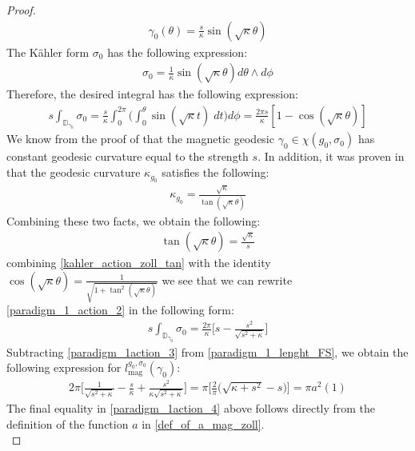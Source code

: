 \documentclass[11pt]{amsart}
\theoremstyle{plain}
\theoremstyle{definition}
\theoremstyle{remark}
\begin{document}
\begin{proof}
\begin{align}\label{mag_geodesic_cpn_eqn}
    \gamma_0(\theta) =\frac{s}{\kappa} \sin(\sqrt{\kappa}\theta) 
\end{align}
The K\"ahler form $\sigma_0$ has the following expression:
\begin{align}\label{kahler_form_pos_curvature}
    \sigma_0 = \frac{1}{\kappa}\sin{(\sqrt{\kappa}\theta)} d\theta \wedge d\phi
\end{align}
Therefore, the desired integral has the following expression:
\begin{align}\label{paradigm_1_action_2}
    s\int_{\mathbb{D}_{\gamma_0}} \sigma_0 =  \frac{s}{\kappa}\int^{2\pi}_0 \Big(\int^{\theta}_0  \sin (\sqrt{\kappa}t) \; dt \Big) d\phi = \frac{2\pi s}{\kappa}[1-\cos (\sqrt{\kappa}\theta)]
\end{align}
We know from the proof of \cite[Lemma 5.4]{johanna_projective} that the magnetic geodesic $\gamma_0 \in \chi(g_0,\sigma_0)$ has constant geodesic curvature equal to the strength $s$. In addition, it was proven in \cite[(10)]{johanna_projective} that the geodesic curvature $\kappa_{g_0}$ satisfies the following:
\begin{align}
    \kappa_{g_0} = \frac{\sqrt{\kappa}}{\tan (\sqrt{\kappa}\theta)}
\end{align}
Combining these two facts, we obtain the following:
\begin{align}\label{kahler_action_zoll_tan}
    \tan (\sqrt{\kappa}\theta) = \frac{\sqrt{\kappa}}{s}
\end{align}
combining \eqref{kahler_action_zoll_tan} with the identity $\cos(\sqrt{\kappa}\theta) = \frac{1}{\sqrt{1+\tan^2(\sqrt{\kappa}\theta)}}$ we see that we can rewrite \eqref{paradigm_1_action_2} in the following form:
\begin{align}\label{paradigm_1action_3}
s\int_{\mathbb{D}_{\gamma_0}} \sigma_{\text{0}} = \frac{2\pi}{\kappa}\Bigg[s -\frac{s^2}{\sqrt{s^2+\kappa}}\Bigg]
\end{align}  
Subtracting \eqref{paradigm_1action_3} from \eqref{paradigm_1_lenght_FS}, we obtain the following expression for $l^{g_0,\sigma_0}_{\text{mag}}(\gamma_{0})$:
\begin{align}\label{paradigm_1action_4}
    2\pi\Bigg[ \frac{1}{\sqrt{s^{2}+\kappa}} - \frac{s}{\kappa} + \frac{s^2}{\kappa\sqrt{s^{2}+\kappa}} \Bigg] = \pi \Bigg[ \frac{2}{\pi}\Big( \sqrt{\kappa +s^2} -s \Big)\Bigg] = \pi a^2(1)
\end{align}
The final equality in \eqref{paradigm_1action_4} above follows directly from the definition of the function $a$ in \eqref{def_of_a_mag_zoll}.\\

\end{proof}
\end{document}
